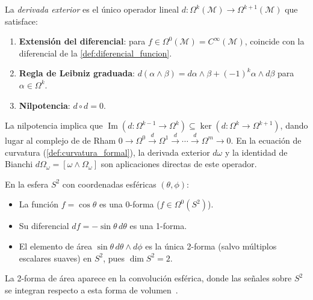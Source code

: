 \begin{definition}\label{def:derivada_exterior}
La \textit{derivada exterior} es el único operador lineal $d: \Omega^k(\mathcal{M}) \to \Omega^{k+1}(\mathcal{M})$ que satisface:
\begin{enumerate}
    \item \textbf{Extensión del diferencial}: para $f \in \Omega^0(\mathcal{M}) = C^\infty(\mathcal{M})$, coincide con la diferencial de la \autoref{def:diferencial_funcion}.
    \item \textbf{Regla de Leibniz graduada}: $d(\alpha \wedge \beta) = d\alpha \wedge \beta + (-1)^k \alpha \wedge d\beta$ para $\alpha \in \Omega^k$.
    \item \textbf{Nilpotencia}: $d \circ d = 0$.
\end{enumerate}
La nilpotencia implica que $\operatorname{Im}(d: \Omega^{k-1} \to \Omega^k) \subseteq \ker(d: \Omega^k \to \Omega^{k+1})$, dando lugar al complejo de de Rham $0 \to \Omega^0 \xrightarrow{d} \Omega^1 \xrightarrow{d} \cdots \xrightarrow{d} \Omega^m \to 0$. En la ecuación de curvatura (\autoref{def:curvatura_formal}), la derivada exterior $d\omega$ y la identidad de Bianchi $d\Omega_\omega = [\omega \wedge \Omega_\omega]$ son aplicaciones directas de este operador.
\end{definition}

\begin{example}\label{ex:formas_esfera}
En la esfera $S^2$ con coordenadas esféricas $(\theta, \phi)$:
\begin{itemize}
    \item La función $f = \cos\theta$ es una 0-forma ($f \in \Omega^0(S^2)$).
    \item Su diferencial $df = -\sin\theta \, d\theta$ es una 1-forma.
    \item El elemento de área $\sin\theta \, d\theta \wedge d\phi$ es la única 2-forma (salvo múltiplos escalares suaves) en $S^2$, pues $\dim S^2 = 2$.
\end{itemize}
La 2-forma de área aparece en la convolución esférica, donde las señales sobre $S^2$ se integran respecto a esta forma de volumen~\citep{cohen2018sphericalcnns}.
\end{example}

